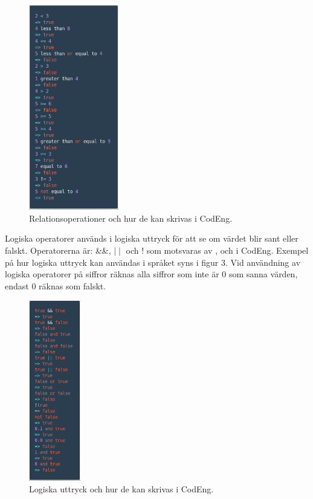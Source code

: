 \documentclass{article}
\begin{document}
\FloatBarrier
\begin{figure}[h!]
    \centering
    \includegraphics[width=0.35\textwidth]{relation.png}
    \caption{Relationsoperationer och hur de kan skrivas i CodEng.}
    \label{fig:rel1}
\end{figure}
\FloatBarrier

Logiska operatorer används i logiska uttryck för att se om värdet blir sant eller falskt. Operatorerna är:
\&\&, \(\mid \mid\) och ! som motsvaras av ,  och  i CodEng. Exempel på hur logiska uttryck kan användas i språket syns i figur 3. Vid användning av logiska operatorer på siffror räknas alla siffror som inte är 0 som sanna värden, endast 0 räknas som falskt.


\FloatBarrier
\begin{figure}[h!]
    \centering
    \includegraphics[width=0.20\textwidth]{logic.png}
    \caption{Logiska uttryck och hur de kan skrivas i CodEng.}
    \label{fig:logic1}
\end{figure}
\FloatBarrier
\end{document}
